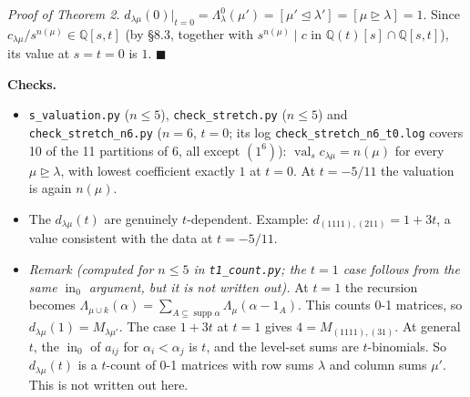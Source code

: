 \documentclass[11pt]{article}
\theoremstyle{definition}
\newcommand{\Q}{\mathbb{Q}}
\newcommand{\dom}{\trianglerighteq}
\newcommand{\domd}{\trianglelefteq}
\newcommand{\val}{\operatorname{val}}
\newcommand{\supp}{\operatorname{supp}}
\newcommand{\inn}{\operatorname{in}}
\newcommand{\file}[1]{\texttt{#1}}
\begin{document}
\medskip
\noindent\emph{Proof of Theorem 2.} $d_{\lambda\mu}(0)|_{t=0} = \Lambda^0_\lambda(\mu') = [\mu' \domd \lambda'] = [\mu \dom \lambda] = 1$. Since $c_{\lambda\mu}/s^{n(\mu)} \in \Q[s,t]$ (by \S8.3, together with $s^{n(\mu)} \mid c$ in $\Q(t)[s] \cap \Q[s,t]$), its value at $s = t = 0$ is $1$. \hfill$\blacksquare$

\medskip
\noindent\textbf{Checks.}
\begin{itemize}
\item \file{s\_valuation.py} ($n \le 5$), \file{check\_stretch.py} ($n \le 5$) and \file{check\_stretch\_n6.py} ($n = 6$, $t = 0$; its log \file{check\_stretch\_n6\_t0.log} covers 10 of the 11 partitions of $6$, all except $(1^6)$): $\val_s c_{\lambda\mu} = n(\mu)$ for every $\mu \dom \lambda$, with lowest coefficient exactly $1$ at $t = 0$. At $t = -5/11$ the valuation is again $n(\mu)$.
\item The $d_{\lambda\mu}(t)$ are genuinely $t$-dependent. Example: $d_{(1111),(211)} = 1 + 3t$, a value consistent with the data at $t = -5/11$.
\item \emph{Remark (computed for $n \le 5$ in \file{t1\_count.py}; the $t = 1$ case follows from the same $\inn_0$ argument, but it is not written out).} At $t = 1$ the recursion becomes $\Lambda_{\mu\cup k}(\alpha) = \sum_{A \subseteq \supp\alpha} \Lambda_\mu(\alpha - 1_A)$. This counts 0-1 matrices, so $d_{\lambda\mu}(1) = M_{\lambda\mu'}$. The case $1 + 3t$ at $t = 1$ gives $4 = M_{(1111),(31)}$. At general $t$, the $\inn_0$ of $a_{ij}$ for $\alpha_i < \alpha_j$ is $t$, and the level-set sums are $t$-binomials. So $d_{\lambda\mu}(t)$ is a $t$-count of 0-1 matrices with row sums $\lambda$ and column sums $\mu'$. This is not written out here.
\end{itemize}
\end{document}
